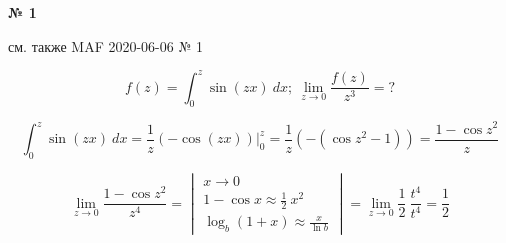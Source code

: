 \documentclass{article}
\begin{document}
\textbf{№ 1} 
\large

см. также MAF 2020-06-06 № 1

$$ f(z) = \int_{0}^{z} \sin{(zx)} \ dx; \ \lim\limits_{z \to 0} \frac{f(z)}{z^3} = ? $$

$$ \int_{0}^{z} \sin{(zx)} \ dx
= \frac{1}{z} \left( -\cos{(zx)} \right) \bigg\vert_{0}^{z}
= \frac{1}{z} \left( -(\cos{z^2} - 1) \right) 
= \frac{1 - \cos{z^2}}{z} $$  

$$ \lim\limits_{z \to 0} \frac{1 - \cos{z^2}}{z^4} 
= \begin{vmatrix}
        x \to 0 \\
        1 - \cos{x} \approx \frac{1}{2} \ x^2 \\
        \log_b(1+x) \approx \frac{x}{\ln{b}}
   \end{vmatrix}
= \lim\limits_{z \to 0} \frac{1}{2} \ \frac{t^4}{t^4} 
= \frac{1}{2} $$ 
\end{document}
